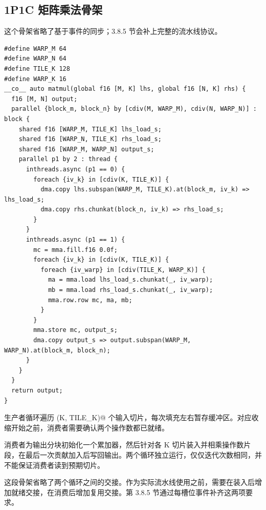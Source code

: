 \subsection*{1P1C 矩阵乘法骨架}

这个骨架省略了基于事件的同步；3.8.5 节会补上完整的流水线协议。

\begin{lstlisting}[language=croqtile,caption={一个 1P1C 矩阵乘法骨架}]
#define WARP_M 64
#define WARP_N 64
#define TILE_K 128
#define WARP_K 16
__co__ auto matmul(global f16 [M, K] lhs, global f16 [N, K] rhs) {
  f16 [M, N] output;
  parallel {block_m, block_n} by [cdiv(M, WARP_M), cdiv(N, WARP_N)] : block {
    shared f16 [WARP_M, TILE_K] lhs_load_s;
    shared f16 [WARP_N, TILE_K] rhs_load_s;
    shared f16 [WARP_M, WARP_N] output_s;
    parallel p1 by 2 : thread {
      inthreads.async (p1 == 0) {
        foreach {iv_k} in [cdiv(K, TILE_K)] {
          dma.copy lhs.subspan(WARP_M, TILE_K).at(block_m, iv_k) => lhs_load_s;
          dma.copy rhs.chunkat(block_n, iv_k) => rhs_load_s;
        }
      }
      inthreads.async (p1 == 1) {
        mc = mma.fill.f16 0.0f;
        foreach {iv_k} in [cdiv(K, TILE_K)] {
          foreach {iv_warp} in [cdiv(TILE_K, WARP_K)] {
            ma = mma.load lhs_load_s.chunkat(_, iv_warp);
            mb = mma.load rhs_load_s.chunkat(_, iv_warp);
            mma.row.row mc, ma, mb;
          }
        }
        mma.store mc, output_s;
        dma.copy output_s => output.subspan(WARP_M, WARP_N).at(block_m, block_n);
      }
    }
  }
  return output;
}
\end{lstlisting}

生产者循环遍历 \co@cdiv(K, TILE_K)@ 个输入切片，每次填充左右暂存缓冲区。对应收缩开始之前，消费者需要确认两个操作数都已就绪。

消费者为输出分块初始化一个累加器，然后针对各 K 切片装入并相乘操作数片段，在最后一次贡献加入后写回输出。两个循环独立运行，仅仅迭代次数相同，并不能保证消费者读到预期切片。

这段骨架省略了两个循环之间的交接。作为实际流水线使用之前，需要在装入后增加就绪交接，在消费后增加复用交接。第 3.8.5 节通过每槽位事件补齐这两项要求。
